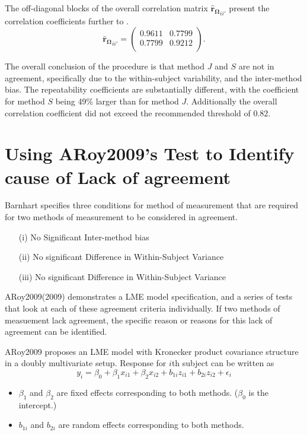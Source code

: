 \documentclass[12pt, a4paper]{report}
\theoremstyle{plain}
\theoremstyle{definition}
\theoremstyle{remark}
\begin{document}
	The off-diagonal blocks of the overall correlation matrix $\boldsymbol{\hat{r}_{\Omega}}_{ii'}$ present the correlation coefficients further to \citet{hamlett}.
	\[
	\boldsymbol{\hat{r}_{\Omega}}_{ii'} = \left( \begin{array}{cc}
	0.9611  & 0.7799  \\
	0.7799  & 0.9212  \\
	\end{array}\right).
	\]
	
	The overall conclusion of the procedure is that method $J$ and $S$ are not in agreement, specifically due to the within-subject variability, and the inter-method bias. The repeatability coefficients are substantially different, with the coefficient for method $S$ being 49\% larger than for method $J$. Additionally the overall correlation coefficient did not exceed the recommended threshold of $0.82$.
	
	
	
	
	\section*{Using ARoy2009's Test to Identify cause of Lack of agreement}
	
	Barnhart specifies three conditions for method of measurement that are required for two methods of measurement to be considered in agreement.
	
	\begin{itemize}
		\item[(i)] No Significant Inter-method bias
		\item[(ii)] No significant Difference in Within-Subject Variance
		\item[(iii)] No significant Difference in Within-Subject Variance 
	\end{itemize}
	
	
	ARoy2009(2009) demonstrates a LME model specification, and a series of tests that look at each of these agreement criteria individually. If two methods of measuement lack agreement, the specific reason or reasons for this lack of agreement can be identified.
	
	
	ARoy2009 proposes an LME model with Kronecker product covariance structure in a doubly multivariate setup. Response for $i$th subject can be written as
	\[ y_i = \beta_0 + \beta_1x_{i1} + \beta_2x_{i2} + b_{1i}z_{i1}  + b_{2i}z_{i2} + \epsilon_i \]
	\begin{itemize}
		\item $\beta_1$ and $\beta_2$ are fixed effects corresponding to both methods. ($\beta_0$ is the intercept.)
		\item $b_{1i}$ and $b_{2i}$ are random effects corresponding to both methods.
	\end{itemize}
	
\end{document}
